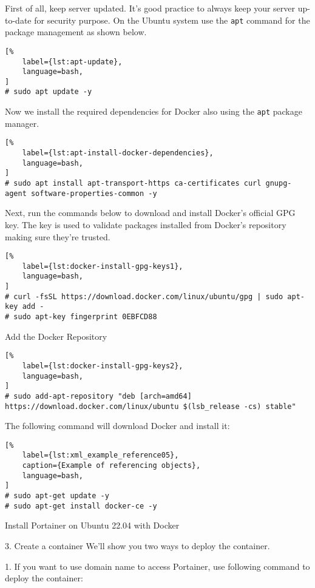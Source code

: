 \documentclass[%
	a4paper,
	oneside,
	listof=numbered,
	parskip=half,
	headsepline=true,
	footsepline=false,
	0.7headlines,
	]{scrbook}
\begin{document}
First of all, keep server updated.
It's good practice to always keep your server up-to-date for security purpose.
On the Ubuntu system use the \verb|apt| command for the package management as shown below.

\begin{lstlisting}[%
	label={lst:apt-update},
	language=bash,
]
# sudo apt update -y
\end{lstlisting}

Now we install the required dependencies for Docker also using the \verb|apt| package manager.

\begin{lstlisting}[%
	label={lst:apt-install-docker-dependencies},
	language=bash,
]
# sudo apt install apt-transport-https ca-certificates curl gnupg-agent software-properties-common -y
\end{lstlisting}


Next, run the commands below to download and install Docker’s official GPG key.
The key is used to validate packages installed from Docker’s repository making sure they’re trusted.

\begin{lstlisting}[%
	label={lst:docker-install-gpg-keys1},
	language=bash,
]
# curl -fsSL https://download.docker.com/linux/ubuntu/gpg | sudo apt-key add -
# sudo apt-key fingerprint 0EBFCD88
\end{lstlisting}

Add the Docker Repository

\begin{lstlisting}[%
	label={lst:docker-install-gpg-keys2},
	language=bash,
]
# sudo add-apt-repository "deb [arch=amd64] https://download.docker.com/linux/ubuntu $(lsb_release -cs) stable"
\end{lstlisting}

The following command will download Docker and install it:

\begin{lstlisting}[%
	label={lst:xml_example_reference05},
	caption={Example of referencing objects},
	language=bash,
]
# sudo apt-get update -y
# sudo apt-get install docker-ce -y
\end{lstlisting}

Install Portainer on Ubuntu 22.04 with Docker

3. Create a container
We’ll show you two ways to deploy the container.

1.
If you want to use domain name to access Portainer, use following command to deploy the container:
\end{document}
